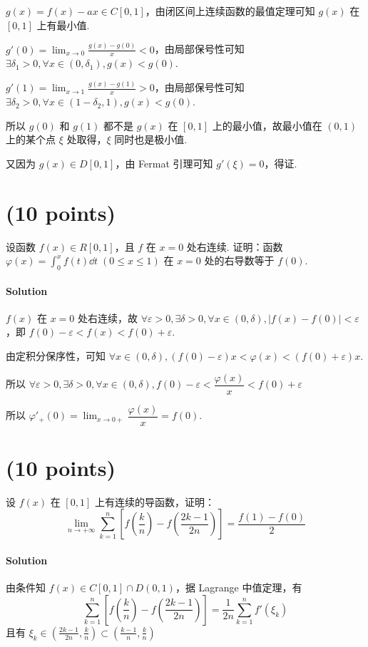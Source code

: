 \documentclass{ctexart}
\begin{document}
    $g(x)=f(x)-ax \in C[0,1]$，由闭区间上连续函数的最值定理可知 $g(x)$ 在 $[0,1]$ 上有最小值.

    $g'(0)=\displaystyle\lim_{x\to 0} \frac{g(x)-g(0)}{x}<0$，由局部保号性可知 $\exists \delta_1>0, \forall x \in (0,\delta_1), g(x)<g(0)$.

    $g'(1)=\displaystyle\lim_{x\to 1} \frac{g(x)-g(1)}{x}>0$，由局部保号性可知 $\exists \delta_2>0, \forall x \in (1-\delta_2,1), g(x)<g(0)$.

    所以 $g(0)$ 和 $g(1)$ 都不是 $g(x)$ 在 $[0,1]$ 上的最小值，故最小值在 $(0,1)$ 上的某个点 $\xi$ 处取得，$\xi$ 同时也是极小值.

    又因为 $g(x)\in D[0,1]$，由 Fermat 引理可知 $g'(\xi)=0$，得证.


\section{(10 points)}
    设函数 $f(x)\in R[0,1]$，且 $f$ 在 $x=0$ 处右连续. 证明：函数 $\varphi(x)=\displaystyle\int_0^x f(t) \dd{t} \;(0 \leqslant x \leqslant 1)$ 在 $x=0$ 处的右导数等于 $f(0)$.
\paragraph{Solution}
    $f(x)$ 在 $x=0$ 处右连续，故 $\forall \varepsilon>0, \exists \delta>0, \forall x \in (0,\delta), |f(x)-f(0)|<\varepsilon$，即 $f(0)-\varepsilon<f(x)<f(0)+\varepsilon$.

    由定积分保序性，可知 $\forall x \in (0,\delta), (f(0)-\varepsilon)x<\varphi(x)<(f(0)+\varepsilon)x$.

    所以 $\forall \varepsilon>0, \exists \delta>0, \forall x \in (0,\delta),  f(0)-\varepsilon<\dfrac{\varphi(x)}{x}<f(0)+\varepsilon$

    所以 $\varphi'_+(0) = \displaystyle\lim_{x\to 0+} \dfrac{\varphi(x)}{x} = f(0)$.


\section{(10 points)}
    设 $f(x)$ 在 $[0,1]$ 上有连续的导函数，证明：
    \[
        \lim_{n \to +\infty} \sum_{k=1}^n \left[ f\left(\frac{k}{n}\right) - f\left(\frac{2k-1}{2n}\right) \right] = \frac{f(1)-f(0)}{2}
    \]
\paragraph{Solution}
    由条件知 $f(x) \in C[0,1] \cap D(0,1)$，据 Lagrange 中值定理，有
    \[ \displaystyle{\sum_{k=1}^n \left[ f\left(\frac{k}{n}\right) - f\left(\frac{2k-1}{2n}\right) \right] = \frac{1}{2n} \sum_{k=1}^n f'(\xi_k)} \]
    且有 $\xi_k \in \left( \frac{2k-1}{2n},\frac{k}{n} \right) \subset \left( \frac{k-1}{n}, \frac{k}{n} \right)$
\end{document}
